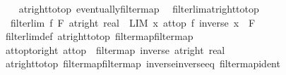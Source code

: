 \begin{isabellebody}
%
\isadelimproof
\ \ %
\endisadelimproof
%
\isatagproof
{}\isamarkupfalse%
\ at{\isacharunderscore}{\kern0pt}right{\isacharunderscore}{\kern0pt}to{\isacharunderscore}{\kern0pt}top\ eventually{\isacharunderscore}{\kern0pt}filtermap\ \isacommand{{\isachardot}{\kern0pt}{\isachardot}{\kern0pt}}\isamarkupfalse%
%
\endisatagproof
{\isafoldproof}%
%
\isadelimproof
\isanewline
%
\endisadelimproof
\isanewline
{}\isamarkupfalse%
\ filterlim{\isacharunderscore}{\kern0pt}at{\isacharunderscore}{\kern0pt}right{\isacharunderscore}{\kern0pt}to{\isacharunderscore}{\kern0pt}top{\isacharcolon}{\kern0pt}\isanewline
\ \ {\isachardoublequoteopen}filterlim\ f\ F\ {\isacharparenleft}{\kern0pt}at{\isacharunderscore}{\kern0pt}right\ {\isacharparenleft}{\kern0pt}{}{\isacharcolon}{\kern0pt}{\isacharcolon}{\kern0pt}real{\isacharparenright}{\kern0pt}{\isacharparenright}{\kern0pt}\ {\isasymlongleftrightarrow}\ {\isacharparenleft}{\kern0pt}LIM\ x\ at{\isacharunderscore}{\kern0pt}top{\isachardot}{\kern0pt}\ f\ {\isacharparenleft}{\kern0pt}inverse\ x{\isacharparenright}{\kern0pt}\ {\isacharcolon}{\kern0pt}{\isachargreater}{\kern0pt}\ F{\isacharparenright}{\kern0pt}{\isachardoublequoteclose}\isanewline
%
\isadelimproof
\ \ %
\endisadelimproof
%
\isatagproof
{}\isamarkupfalse%
\ filterlim{\isacharunderscore}{\kern0pt}def\ at{\isacharunderscore}{\kern0pt}right{\isacharunderscore}{\kern0pt}to{\isacharunderscore}{\kern0pt}top\ filtermap{\isacharunderscore}{\kern0pt}filtermap\ \isacommand{{\isachardot}{\kern0pt}{\isachardot}{\kern0pt}}\isamarkupfalse%
%
\endisatagproof
{\isafoldproof}%
%
\isadelimproof
\isanewline
%
\endisadelimproof
\isanewline
{}\isamarkupfalse%
\ at{\isacharunderscore}{\kern0pt}top{\isacharunderscore}{\kern0pt}to{\isacharunderscore}{\kern0pt}right{\isacharcolon}{\kern0pt}\ {\isachardoublequoteopen}at{\isacharunderscore}{\kern0pt}top\ {\isacharequal}{\kern0pt}\ filtermap\ inverse\ {\isacharparenleft}{\kern0pt}at{\isacharunderscore}{\kern0pt}right\ {\isacharparenleft}{\kern0pt}{}{\isacharcolon}{\kern0pt}{\isacharcolon}{\kern0pt}real{\isacharparenright}{\kern0pt}{\isacharparenright}{\kern0pt}{\isachardoublequoteclose}\isanewline
%
\isadelimproof
\ \ %
\endisadelimproof
%
\isatagproof
{}\isamarkupfalse%
\ at{\isacharunderscore}{\kern0pt}right{\isacharunderscore}{\kern0pt}to{\isacharunderscore}{\kern0pt}top\ filtermap{\isacharunderscore}{\kern0pt}filtermap\ inverse{\isacharunderscore}{\kern0pt}inverse{\isacharunderscore}{\kern0pt}eq\ filtermap{\isacharunderscore}{\kern0pt}ident\ \isacommand{{\isachardot}{\kern0pt}{\isachardot}{\kern0pt}}\isamarkupfalse%

\end{isabellebody}
